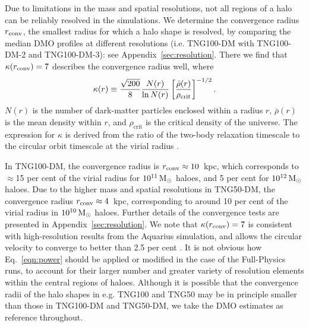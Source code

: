 \documentclass[fleqn,usenatbib]{mnras}
\def\msun{\,\rm M_{\odot}}
\begin{document}
Due to limitations in the mass and spatial resolutions, not all regions of a halo can be reliably resolved in the simulations.
We determine the convergence radius $r_{\rm conv}$, the smallest radius for which a halo shape is resolved, by comparing the median DMO profiles at different resolutions (i.e. TNG100-DM with TNG100-DM-2 and TNG100-DM-3): see Appendix~\ref{sec:resolution}.
There we find that $\kappa(r_{\rm conv}) = 7$ describes the convergence radius well, where 
\begin{equation}
    \kappa(r) \equiv \frac{\sqrt{200}}{8} \frac{N(r)}{\ln N(r)} 
    \left[ \frac{\bar\rho(r)}{\rho_{\rm crit}} \right]^{-1/2}.
    \label{eqn:power}
\end{equation}
$N(r)$ is the number of dark-matter particles enclosed within a radius $r$, $\bar \rho(r)$ is the mean density within $r$, and $\rho_\text{crit}$ is the critical density of the universe.
The expression for $\kappa$ is derived from the ratio of the two-body relaxation timescale to the circular orbit timescale at the virial radius \citep{Power2003v338, Vera-Ciro2011}.

In TNG100-DM, the convergence radius is $r_{\rm conv} \approx 10$~kpc, which corresponds to ${\approx}$15 per cent of the virial radius for $10^{11} \msun$ haloes, and 5 per cent for $10^{12} \msun$ haloes.
Due to the higher mass and spatial resolutions in TNG50-DM, the convergence radius $r_{\rm conv} \approx 4$~kpc, corresponding to around 10 per cent of the virial radius in $10^{10} \msun$ haloes.
Further details of the convergence tests are presented in Appendix~\ref{sec:resolution}.
We note that $\kappa(r_{\rm conv}) = 7$ is consistent with high-resolution results from the Aquarius simulation, and allows the circular velocity to converge to better than 2.5 per cent \citep{Navarro10v402,Vera-Ciro2011}. 
It is not obvious how Eq.~\ref{eqn:power} should be applied or modified in the case of the Full-Physics runs, to account for their larger number and greater variety of resolution elements within the central regions of haloes. 
Although it is possible that the convergence radii of the halo shapes in e.g. TNG100 and TNG50 may be in principle smaller than those in TNG100-DM and TNG50-DM, we take the DMO estimates as reference throughout.

\end{document}

